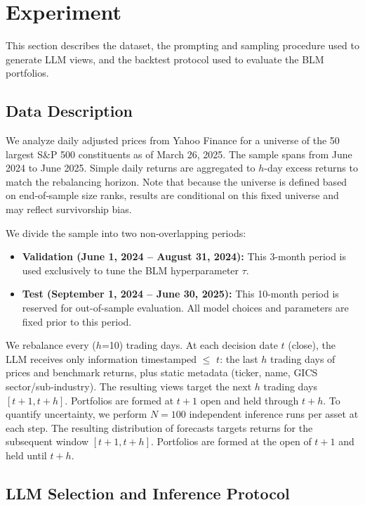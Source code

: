 \section{Experiment}

This section describes the dataset, the prompting and sampling procedure used to generate LLM views, and the backtest protocol used to evaluate the BLM portfolios.

\subsection{Data Description}

We analyze daily adjusted prices from Yahoo Finance for a universe of the 50 largest S\&P 500 constituents as of March 26, 2025. The sample spans from June 2024 to June 2025. Simple daily returns are aggregated to $h$-day excess returns to match the rebalancing horizon. Note that because the universe is defined based on end‑of‑sample size ranks, results are conditional on this fixed universe and may reflect survivorship bias. 

We divide the sample into two non‑overlapping periods:
\begin{itemize}
    \item \textbf{Validation (June 1, 2024 -- August 31, 2024):} This 3-month period is used exclusively to tune the BLM hyperparameter $\tau$.
    \item \textbf{Test (September 1, 2024 -- June 30, 2025):} This 10-month period is reserved for out-of-sample evaluation. All model choices and parameters are fixed prior to this period.
\end{itemize}

We rebalance every ($h$=10) trading days. At each decision date $t$ (close), the LLM receives only information timestamped $\le$ $t$: the last $h$ trading days of prices and benchmark returns, plus static metadata (ticker, name, GICS sector/sub‑industry). The resulting views target the next $h$ trading days $[t+1, t+h]$. Portfolios are formed at $t+1$ open and held through $t+h$.
To quantify uncertainty, we perform $N=100$ independent inference runs per asset at each step. The resulting distribution of forecasts targets returns for the subsequent window $[t+1, t+h]$. Portfolios are formed at the open of $t+1$ and held until $t+h$.

\subsection{LLM Selection and Inference Protocol}

